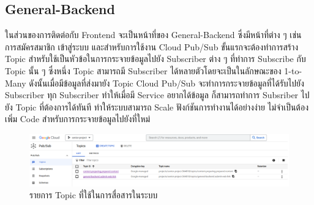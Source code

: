 \documentclass[12pt,oneside,openright,a4paper]{cpe-thai-project}
\begin{document}
\subsection{General-Backend}
  \hspace{1cm}ในส่วนของการติดต่อกับ Frontend จะเป็นหน้าที่ของ General-Backend ซึ่งมีหน้าที่ต่าง ๆ เช่น การสมัครสมาชิก เข้าสู่ระบบ 
  และสำหรับการใช้งาน Cloud Pub/Sub ขั้นแรกจะต้องทำการสร้าง Topic สำหรับใช้เป็นหัวข้อในการกระจายข้อมูลไปยัง Subscriber ต่าง ๆ ที่ทำการ Subscribe กับ Topic นั้น ๆ
  ซึ่งหนึ่ง Topic สามารถมี Subscriber ได้หลายตัวโดยจะเป็นในลักษณะของ 1-to-Many ดังนั้นเมื่อมีข้อมูลที่ส่งมายัง Topic Cloud Pub/Sub จะทำการกระจายข้อมูลที่ได้รับไปยัง 
  Subscriber ทุก Subscriber ทำให้เมื่อมี Service อยากได้ข้อมูล ก็สามารถทำการ Subsriber ไปยัง Topic ที่ต้องการได้ทันที 
  ทำให้ระบบสามารถ Scale ฟังก์ชันการทำงานได้อย่างง่าย ไม่จำเป็นต้องเพิ่ม Code สำหรับการกระจายข้อมูลไปยังที่ใหม่
  \begin{figure}[!ht]\centering
    \includegraphics[width=\textwidth]{./img/topic.png}
    \caption{รายการ Topic ที่ใช้ในการสื่อสารในระบบ}\label{fig:topic_list}
  \end{figure}
\end{document}

